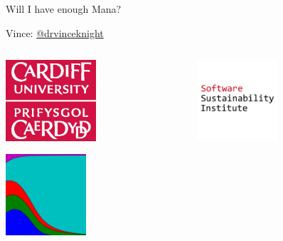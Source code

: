 \documentclass{beamer}
\begin{document}
    \begin{frame}
        \begin{center}
            \Huge
                Will I have enough Mana?

               \vfill

            \Large
               Vince: \href{https://twitter.com/drvinceknight}{@drvinceknight}\\
        \end{center}

    \end{frame}

    \begin{frame}
               \begin{columns}
                   \begin{column}{.45\textwidth}
                       \begin{center}
                       \includegraphics[height=3cm]{./img/CUident_CMYK/main.eps}
                       \end{center}

                       \begin{center}
                       \includegraphics[height=3cm]{./img/axelrod_logo/main.png}
                       \end{center}
                   \end{column}
                   \begin{column}{.45\textwidth}
                       \begin{center}
                       \includegraphics[height=3cm]{./img/ssi-logo/main.png}
                       \end{center}


\end{column}
\end{columns}
\end{frame}
\end{document}

